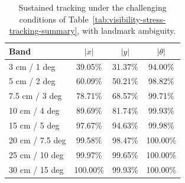 \begin{table}[!htbp]
    \centering
    \caption{\scriptsize Sustained tracking under the challenging conditions of
Table~\ref{tab:visibility-stress-tracking-summary}, with landmark ambiguity.}
    \label{tab:landmark-ambiguity-tracking}
    \scriptsize
    \setlength{\tabcolsep}{5pt}
    \begin{tabular}{lccc}
        \toprule
        Band & $|x|$ & $|y|$ & $|\theta|$ \\
        \midrule
        3 cm / 1 deg & 39.05\% & 31.37\% & 94.00\% \\
        5 cm / 2 deg & 60.09\% & 50.21\% & 98.82\% \\
        7.5 cm / 3 deg & 78.71\% & 68.57\% & 99.71\% \\
        10 cm / 4 deg & 89.69\% & 81.74\% & 99.93\% \\
        15 cm / 5 deg & 97.67\% & 94.63\% & 99.98\% \\
        20 cm / 7.5 deg & 99.58\% & 98.47\% & 100.00\% \\
        25 cm / 10 deg & 99.97\% & 99.65\% & 100.00\% \\
        30 cm / 15 deg & 100.00\% & 99.93\% & 100.00\% \\
        \bottomrule
    \end{tabular}
\end{table}
\FloatBarrier
